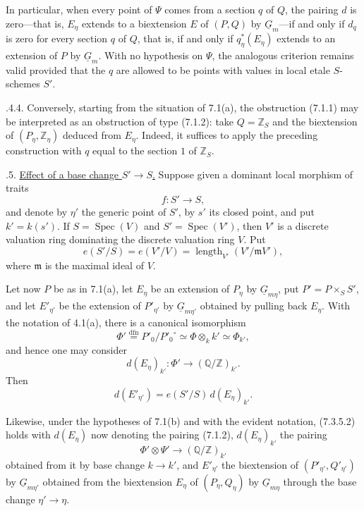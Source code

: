 In particular, when every point of $\Psi$ comes from a section $q$ of $Q$,
the pairing $d$ is zero---that is, $E_\eta$ extends to a biextension $E$ of
$(P,Q)$ by $\underline G_m$---if and only if $d_q$ is zero for every
section $q$ of $Q$, that is, if and only if $q_\eta^*(E_\eta)$ extends to
an extension of $P$ by $\underline G_m$.  With no hypothesis on $\Psi$,
the analogous criterion remains valid provided that the $q$ are allowed to
be points with values in local etale $S$-schemes $S'$.

\smallskip
{}.4.4.  Conversely, starting from the situation of 7.1(a), the
obstruction (7.1.1) may be interpreted as an obstruction of type (7.1.2):
take $Q=\mathbb Z_S$ and the biextension of $(P_\eta,\mathbb Z_\eta)$
deduced from $E_\eta$.  Indeed, it suffices to apply the preceding
construction with $q$ equal to the section $1$ of $\mathbb Z_S$.

\medskip
{}.5.  \underline{Effect of a base change $S'\to S$.}  Suppose
given a dominant local morphism of traits
\[
 f:S'\longrightarrow S,
\]
and denote by $\eta'$ the generic point of $S'$, by $s'$ its closed point,
and put $k'=k(s')$.  If $S=\operatorname{Spec}(V)$ and
$S'=\operatorname{Spec}(V')$, then $V'$ is a discrete valuation ring
dominating the discrete valuation ring $V$.  Put
\begin{equation}\tag{7.3.5.1}
 e(S'/S)=e(V'/V)=\operatorname{length}_{V'}(V'/\mathfrak m V'),
\end{equation}
where $\mathfrak m$ is the maximal ideal of $V$.

Let now $P$ be as in 7.1(a), let $E_\eta$ be an extension of $P_\eta$ by
$\underline G_{m\eta}$, put $P'=P\times_S S'$, and let $E'_{\eta'}$ be
the extension of $P'_{\eta'}$ by $\underline G_{m\eta'}$ obtained by
pulling back $E_\eta$.  With the notation of 4.1(a), there is a canonical
isomorphism
\[
 \Phi'\overset{\mathrm{dfn}}{=}P'_0/{P'_0}^{\circ}
 \simeq\Phi\otimes_k k'\simeq\Phi_{k'},
\]
and hence one may consider
\[
 d(E_\eta)_{k'}:\Phi'\longrightarrow(\mathbb Q/\mathbb Z)_{k'}.
\]
Then
\begin{equation}\tag{7.3.5.2}
 d(E'_{\eta'})=e(S'/S)\,d(E_\eta)_{k'}.
\end{equation}

Likewise, under the hypotheses of 7.1(b) and with the evident notation,
(7.3.5.2) holds with $d(E_\eta)$ now denoting the pairing (7.1.2),
$d(E_\eta)_{k'}$ the pairing
\[
 \Phi'\otimes\Psi'\longrightarrow(\mathbb Q/\mathbb Z)_{k'}
\]
obtained from it by base change $k\to k'$, and $E'_{\eta'}$ the
biextension of $(P'_{\eta'},Q'_{\eta'})$ by
$\underline G_{m\eta'}$ obtained from the biextension $E_\eta$ of
$(P_\eta,Q_\eta)$ by $\underline G_{m\eta}$ through the base change
$\eta'\to\eta$.

